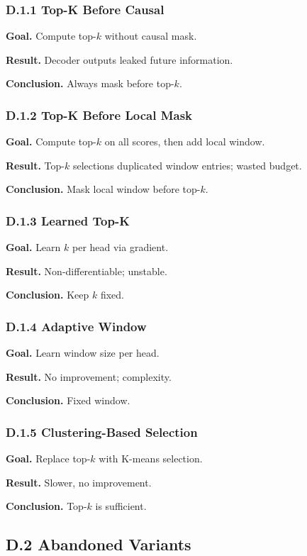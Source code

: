 \subsubsection{D.1.1 Top-K Before Causal}

\textbf{Goal.} Compute top-$k$ without causal mask.

\textbf{Result.} Decoder outputs leaked future information.

\textbf{Conclusion.} Always mask before top-$k$.

\subsubsection{D.1.2 Top-K Before Local Mask}

\textbf{Goal.} Compute top-$k$ on all scores, then add local window.

\textbf{Result.} Top-$k$ selections duplicated window entries; wasted budget.

\textbf{Conclusion.} Mask local window before top-$k$.

\subsubsection{D.1.3 Learned Top-K}

\textbf{Goal.} Learn $k$ per head via gradient.

\textbf{Result.} Non-differentiable; unstable.

\textbf{Conclusion.} Keep $k$ fixed.

\subsubsection{D.1.4 Adaptive Window}

\textbf{Goal.} Learn window size per head.

\textbf{Result.} No improvement; complexity.

\textbf{Conclusion.} Fixed window.

\subsubsection{D.1.5 Clustering-Based Selection}

\textbf{Goal.} Replace top-$k$ with K-means selection.

\textbf{Result.} Slower, no improvement.

\textbf{Conclusion.} Top-$k$ is sufficient.

\subsection{D.2 Abandoned Variants}

